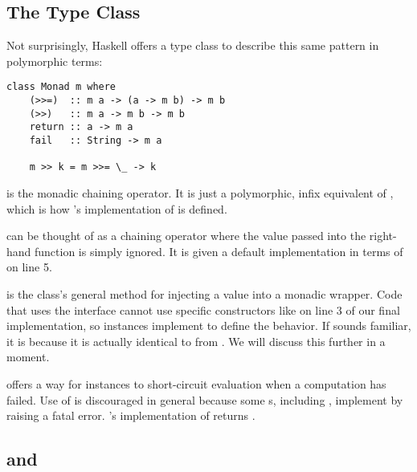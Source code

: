 \subsection{The  Type Class}

Not surprisingly, Haskell offers a type class to describe this same pattern in polymorphic terms:

\begin{lstlisting}
class Monad m where
    (>>=)  :: m a -> (a -> m b) -> m b
    (>>)   :: m a -> m b -> m b
    return :: a -> m a 
    fail   :: String -> m a

    m >> k = m >>= \_ -> k
\end{lstlisting}

\begin{notelist}
    \item \code{(>>=)} is the monadic chaining operator. It is just a polymorphic, infix equivalent of , which is
          how 's implementation of \code{(>>=)} is defined.
    \item \code{(>>)} can be thought of as a chaining operator where the value passed into the right-hand function is simply ignored.
          It is given a default implementation in terms of \code{(>>=)} on line 5.
    \item {} is the  class's general method for injecting a value into a monadic wrapper. Code that uses
          the  interface cannot use specific constructors like  on line 3 of our final 
          implementation, so  instances implement  to define the behavior. If  sounds familiar,
          it is because it is actually identical to  from . We will discuss this further in a moment.
    \item {} offers a way for  instances to short-circuit evaluation when a computation has failed. Use of 
           is discouraged in general because some s, including , implement  by raising a fatal error.
          's implementation of  returns .
\end{notelist}

\subsection{ and }

